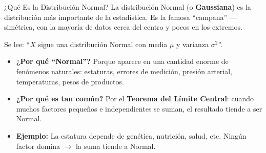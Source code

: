 \documentclass[aspectratio=169, 11pt]{beamer}
\begin{document}
\begin{frame}[shrink=5]{¿Qué Es la Distribución Normal?}
  \vspace{-4pt}
  {\footnotesize
    La distribución Normal (o \textbf{Gaussiana}) es la distribución más importante de la estadística.
    Es la famosa ``campana'' --- simétrica, con la mayoría de datos cerca del centro y pocos en los extremos.}

  \vspace{6pt}
  \begin{center}
  \end{center}

  \vspace{4pt}
  {\footnotesize Se lee: ``$X$ sigue una distribución Normal con media $\mu$ y varianza $\sigma^2$''.}

  \vspace{6pt}
  {\scriptsize
  \begin{itemize}\setlength{\itemsep}{4pt}
    \item[{\color{arcaRed}\scriptsize\faArrowRight}]
      \textbf{¿Por qué ``Normal''?} Porque aparece en una cantidad enorme de fenómenos naturales:
      estaturas, errores de medición, presión arterial, temperaturas, pesos de productos.
    \item[{\color{arcaRed}\scriptsize\faArrowRight}]
      \textbf{¿Por qué es tan común?} Por el \textbf{Teorema del Límite Central}: cuando muchos
      factores pequeños e independientes se suman, el resultado tiende a ser Normal.
    \item[{\color{arcaRed}\scriptsize\faArrowRight}]
      \textbf{Ejemplo:} La estatura depende de genética, nutrición, salud, etc.
      Ningún factor domina $\to$ la suma tiende a Normal.
  \end{itemize}
  }
\end{frame}
\end{document}
